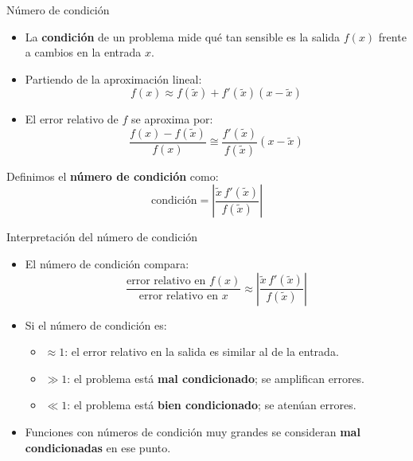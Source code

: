 \documentclass[main.tex]{subfiles}
\begin{document}
\begin{frame}{Número de condición}
\small
\begin{itemize}
  \item La \textbf{condición} de un problema mide qué tan sensible es la salida \(f(x)\)
        frente a cambios en la entrada \(x\).
  \item Partiendo de la aproximación lineal:
  \[
  f(x) \approx f(\tilde{x}) + f'(\tilde{x})(x - \tilde{x})
  \]
  \item El error relativo de \(f\) se aproxima por:
  \[
  \frac{f(x) - f(\tilde{x})}{f(x)}
  \cong
  \frac{f'(\tilde{x})}{f(\tilde{x})}(x - \tilde{x})
  \]
\end{itemize}

Definimos el \textbf{número de condición} como:
\[
\text{condición} =
\left|\frac{\tilde{x}\, f'(\tilde{x})}{f(\tilde{x})}\right|
\]
\end{frame}
\begin{frame}{Interpretación del número de condición}
\small
\begin{itemize}
  \item El número de condición compara:
  \[
    \frac{\text{error relativo en } f(x)}{\text{error relativo en } x}
    \approx \left|\frac{\tilde{x}\, f'(\tilde{x})}{f(\tilde{x})}\right|
  \]
  \item Si el número de condición es:
  \begin{itemize}
    \item \(\approx 1\): el error relativo en la salida es similar al de la entrada.
    \item \(\gg 1\): el problema está \textbf{mal condicionado}; se amplifican errores.
    \item \(\ll 1\): el problema está \textbf{bien condicionado}; se atenúan errores.
  \end{itemize}
  \item Funciones con números de condición muy grandes se consideran
        \textbf{mal condicionadas} en ese punto.
\end{itemize}
\end{frame}
\end{document}
